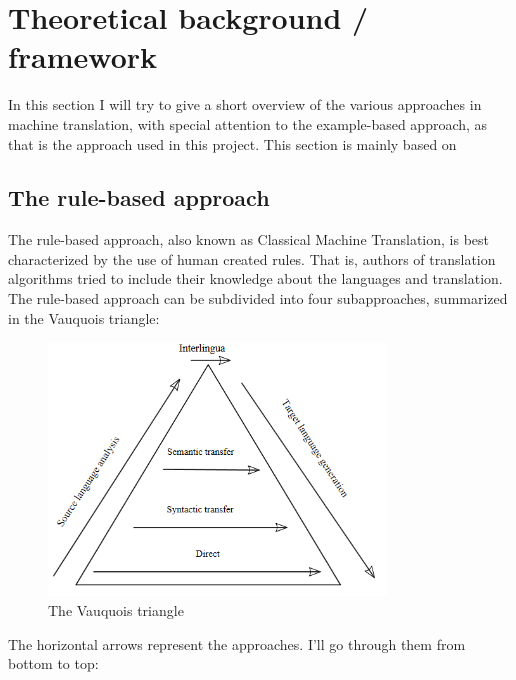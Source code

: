 \documentclass[12pt]{article}
\begin{document}
\section{Theoretical background / framework}

In this section I will try to give a short overview of the various approaches in machine translation, with special attention to the example-based approach, as that is the approach used in this project. This section is mainly based on \citet{vangompel09}

\subsection{The rule-based approach}

The rule-based approach, also known as Classical Machine Translation, is best characterized by the use of human created rules. That is, authors of translation algorithms tried to include their knowledge about the languages and translation. The rule-based approach can be subdivided into four subapproaches, summarized in the Vauquois triangle: \\

\begin{figure}[htb]
\centering
\includegraphics[width=0.8\textwidth]{vauquois.png}
\caption{The Vauquois triangle}
\label{fig:vauquois}
\end{figure}

The horizontal arrows represent the approaches. I'll go through them from bottom to top:
\end{document}
